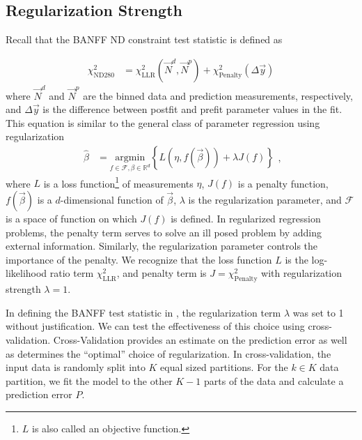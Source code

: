 \subsection{Regularization Strength}

Recall that the BANFF ND constraint test statistic is defined as

\[
\begin{aligned}\chi_{\text{ND280}}^{2} & =\chi_{\text{LLR}}^{2}\left(\vec{N}^{d},\vec{N}^{p}\right)+\chi_{\text{Penalty}}^{2}\left(\Delta\vec{y}\right)\end{aligned}
\]
where $\vec{N}^{d}$ and $\vec{N}^{p}$ are the binned data and prediction
measurements, respectively, and $\Delta\vec{y}$ is the difference
between postfit and prefit parameter values in the fit. This equation
is similar to the general class of parameter regression using regularization
\cite{springer_series978-0-387-84858-7} 
\begin{equation}
\begin{aligned}\hat{\beta} & =\underset{f\in\mathcal{F},\beta\in\mathbb{R}^{d}}{\text{argmin}}\left\{ L\left(\eta,f\left(\vec{\beta}\right)\right)+\lambda J\left(f\right)\right\} \end{aligned}
,\label{eq:GeneralRegularization}
\end{equation}
where $L$ is a loss function\footnote{$L$ is also called an objective function.}
of measurements $\eta$, $J\left(f\right)$ is a penalty function,
$f\left(\vec{\beta}\right)$ is a $d$-dimensional function of $\vec{\beta}$,
$\lambda$ is the regularization parameter, and $\mathcal{F}$ is
a space of function on which $J\left(f\right)$ is defined. In regularized
regression problems, the penalty term serves to solve an ill posed
problem by adding external information. Similarly, the regularization
parameter controls the importance of the penalty. We recognize that
the loss function $L$ is the log-likelihood ratio term $\chi_{\text{LLR}}^{2}$,
and penalty term is $J=\chi_{\text{Penalty}}^{2}$ with regularization
strength $\lambda=1$.

In defining the BANFF test statistic in ,
the regularization term $\lambda$ was set to 1 without justification.
We can test the effectiveness of this choice using cross-validation.
Cross-Validation provides an estimate on the prediction error as well
as determines the ``optimal'' choice of regularization. In cross-validation,
the input data is randomly split into $K$ equal sized partitions.
For the $k\in K$ data partition, we fit the model to the other $K-1$
parts of the data and calculate a prediction error $P$.

